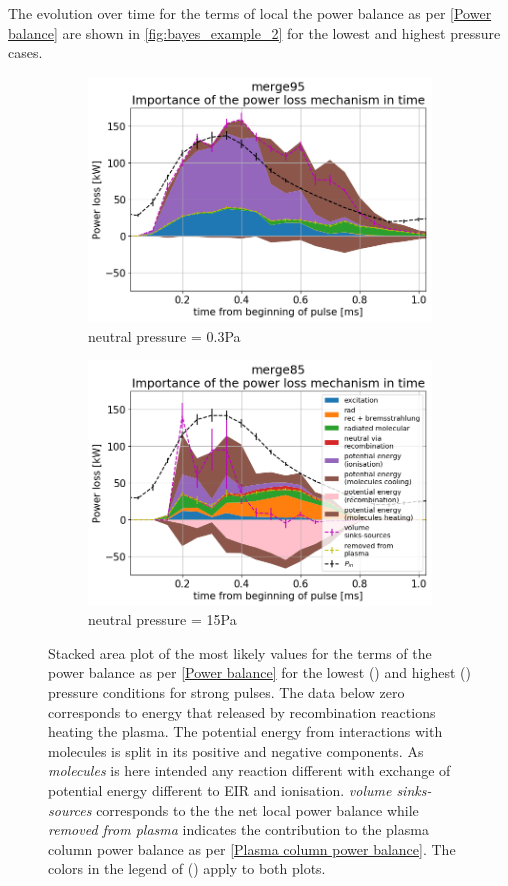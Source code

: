 The evolution over time for the terms of local the power balance as per \autoref{Power balance} are shown in \autoref{fig:bayes_example_2} for the lowest and highest pressure cases.
\begin{figure}
	\centering
     \begin{subfigure}{1\linewidth}
        \centering
    	\includegraphics[width=0.7\linewidth,trim={5 0 5 45},clip]{Chapters/chapter3/figs/_merge95_global_fit_example44.png}
         \caption{neutral pressure = 0.3Pa}
        \label{fig:bayes_example_2a}
    \end{subfigure}
    \hfill
    \begin{subfigure}{1\linewidth}
        \centering
        \includegraphics[width=0.7\linewidth,trim={5 0 5 45},clip]{Chapters/chapter3/figs/_merge85_global_fit_example7.png}
         \caption{neutral pressure = 15Pa}
        \label{fig:bayes_example_2b}
    \end{subfigure}
	\caption{Stacked area plot of the most likely values for the terms of the power balance as per \autoref{Power balance} for the lowest () and highest () pressure conditions for strong pulses. The data below zero corresponds to energy that released by recombination reactions heating the plasma. The potential energy from interactions with molecules is split in its positive and negative components. As \emph{molecules} is here intended any reaction different with exchange of potential energy different to EIR and ionisation. \emph{volume sinks-sources} corresponds to the the net local power balance while \emph{removed from plasma} indicates the contribution to the plasma column power balance as per \autoref{Plasma column power balance}. The colors in the legend of () apply to both plots.}
    \label{fig:bayes_example_2}
\end{figure}
